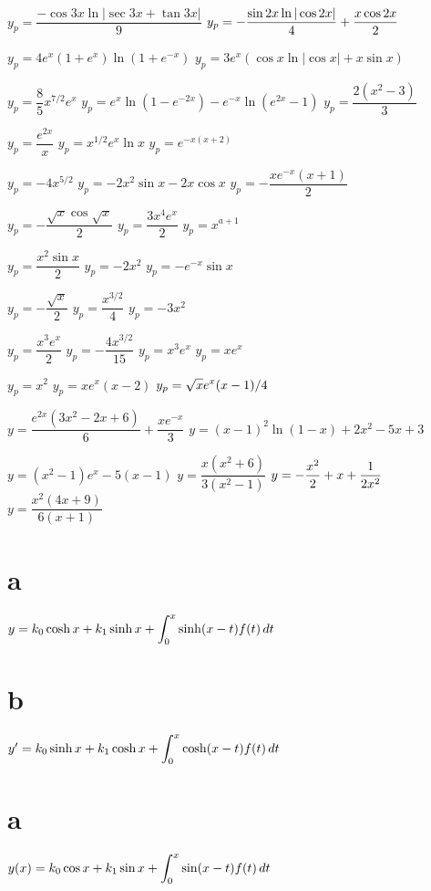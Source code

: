   $y_p=\dfrac{-\cos 3x\ln|\sec 3x+\tan 3x|}{9}$
  $y_p=\displaystyle{-\frac{\sin 2x\ln|\cos 2x|}{4}
+\frac{x\cos 2x}{2}}$

   $y_p=4e^x(1+e^x) \ln(1+e^{-x})$
 $y_p=3e^x(\cos x \ln |\cos x|+x\sin x)$

   $y_p=\dfrac{8}{5} x^{7/2}e^x$
  $y_p=e^x\ln(1-e^{-2x})-e^{-x}\ln(e^{2x}-1)$
 $y_p=\dfrac{2(x^2-3)}{3}$

  $y_p=\dfrac{e^{2x}}{x}$
 $y_p=x^{1/2}e^x\ln x$
   $y_p=e^{-x(x+2)}$

  $y_p=-4x^{5/2}$
  $y_p=-2x^2\sin x-2x\cos x$
  $y_p=-\dfrac{xe^{-x}(x+1)}{2}$

  $y_p=-\dfrac{\sqrt x\cos\sqrt x}{2}$
  $y_p=\dfrac{3x^4e^x}{2}$
  $y_p=x^{a+1}$

  $y_p=\dfrac{x^2\sin x}{2}$
 $y_p=-2x^2$
 $y_p=-e^{-x}\sin x$

 $y_p=-\dfrac{\sqrt x}{2}$
 $y_p=\dfrac{x^{3/2}}{4}$
 $y_p=-3x^2$

 $y_p=\dfrac{x^3e^x}{2}$
 $y_p=-\dfrac{4x^{3/2}}{15}$
 $y_p=x^3e^x$
  $y_p=xe^x$

 $y_p=x^2$
  $y_p=xe^x(x-2)$
 $y_p=\displaystyle{\sqrt xe^x(x-1)/4}$

 $y=\dfrac{e^{2x}(3x^2-2x+6)}{6}+\dfrac{xe^{-x}}{3}$
 $y=(x-1)^2\ln(1-x)+2x^2-5x+3$

 $y=(x^2-1)e^x-5(x-1)$
 $y=\dfrac{x(x^2+6)}{3(x^2-1)}$
 $y=\displaystyle{ -\frac{x^2}{2}+x+\frac{1}{2x^2}}$
 $y=\dfrac{x^2(4x+9)}{6(x+1)}$

\part{a} $y=k_0\cosh x+k_1\sinh x+\displaystyle{\int_0^x}\sinh
(x-t)f(t)\,dt$
\part{b} $y'=k_0\sinh x+k_1\cosh x+\displaystyle{\int_0^x}\cosh
(x-t)f(t)\,dt$

\part{a} $y(x)=k_0\cos x+k_1\sin x+\displaystyle{\int_0^x}\sin
(x-t)f(t)\,dt$
